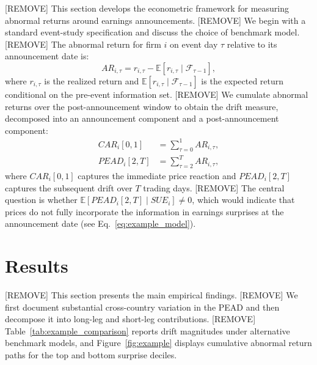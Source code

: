 \documentclass[12pt]{article}
\newcommand{\E}{\mathbb{E}}
\begin{document}
[REMOVE] This section develops the econometric framework for measuring abnormal returns around earnings announcements. [REMOVE] We begin with a standard event-study specification and discuss the choice of benchmark model. [REMOVE] The abnormal return for firm $i$ on event day $\tau$ relative to its announcement date is:
\begin{equation}\label{eq:example_model}
  AR_{i,\tau} = r_{i,\tau} - \E[r_{i,\tau} \mid \mathcal{F}_{\tau-1}],
\end{equation}
where $r_{i,\tau}$ is the realized return and $\E[r_{i,\tau} \mid \mathcal{F}_{\tau-1}]$ is the expected return conditional on the pre-event information set. [REMOVE] We cumulate abnormal returns over the post-announcement window to obtain the drift measure, decomposed into an announcement component and a post-announcement component:
\begin{align}
  CAR_{i}[0,1]  &= \sum_{\tau=0}^{1} AR_{i,\tau}, \label{eq:example_return} \\
  PEAD_{i}[2,T] &= \sum_{\tau=2}^{T} AR_{i,\tau}, \label{eq:example_signal}
\end{align}
where $CAR_{i}[0,1]$ captures the immediate price reaction and $PEAD_{i}[2,T]$ captures the subsequent drift over $T$ trading days. [REMOVE] The central question is whether $\E[PEAD_{i}[2,T] \mid SUE_{i}] \neq 0$, which would indicate that prices do not fully incorporate the information in earnings surprises at the announcement date (see Eq.~\eqref{eq:example_model}).




\section{Results}\label{sec:results}

[REMOVE] This section presents the main empirical findings. [REMOVE] We first document substantial cross-country variation in the PEAD and then decompose it into long-leg and short-leg contributions. [REMOVE] Table~\ref{tab:example_comparison} reports drift magnitudes under alternative benchmark models, and Figure~\ref{fig:example} displays cumulative abnormal return paths for the top and bottom surprise deciles.
\end{document}
